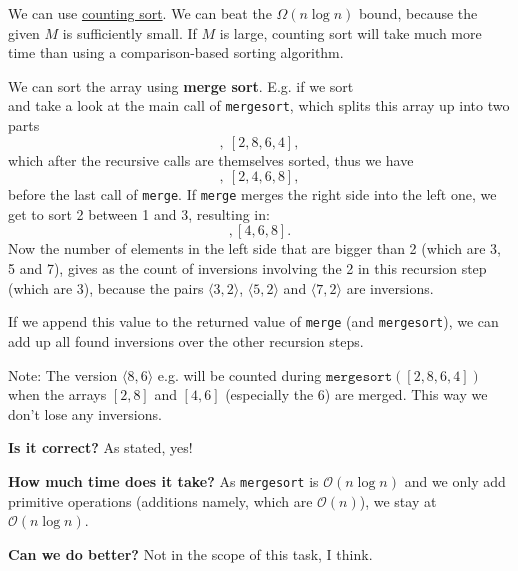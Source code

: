 \documentclass[12pt]{article}
\begin{document}
  We can use \href{https://en.wikipedia.org/wiki/Counting_sort}{counting sort}. We can beat the $\Omega(n\log n)$ bound, because the given $M$ is sufficiently small. If $M$ is large, counting sort will take much more time than using a comparison-based sorting algorithm.
 
  We can sort the array using \textbf{merge sort}. E.g. if we sort \begin{equation*}
 	[1, 5, 3, 7, 2, 8, 6, 4]
 \end{equation*} and take a look at the main call of \texttt{mergesort}, which splits this array up into two parts \begin{equation*}
 	[1, 5, 3, 7],\  [2, 8, 6, 4],
 \end{equation*} which after the recursive calls are themselves sorted, thus we have \begin{equation*}
 	[1, 3, 5, 7],\  [2, 4, 6, 8],
 \end{equation*} before the last call of \texttt{merge}. If \texttt{merge} merges the right side into the left one, we get to sort 2 between 1 and 3, resulting in: \begin{equation*}
 	[1, 2, 3, 5, 7], [4, 6, 8].
 \end{equation*} Now the number of elements in the left side that are bigger than 2 (which are 3, 5 and 7), gives as the count of inversions involving the 2 in this recursion step (which are 3), because the pairs $\langle 3,2\rangle$, $\langle 5,2\rangle$ and $\langle 7,2\rangle$ are inversions.
 
 If we append this value to the returned value of \texttt{merge} (and \texttt{mergesort}), we can add up all found inversions over the other recursion steps.
 
 Note: The version $\langle 8,6\rangle$ e.g. will be counted during $\texttt{mergesort}([2, 8, 6, 4])$ when the arrays $[2,8]$ and $[4, 6]$ (especially the 6) are merged. This way we don't lose any inversions.
 
 \vspace{.5cm}
 \textbf{Is it correct?} As stated, yes!
 
 \textbf{How much time does it take?} As \texttt{mergesort} is $\mathcal{O}(n\log n)$ and we only add primitive operations (additions namely, which are $\mathcal{O}(n)$), we stay at $\mathcal{O}(n\log n)$.
 
 \textbf{Can we do better?} Not in the scope of this task, I think.

 
 
 
\end{document}
